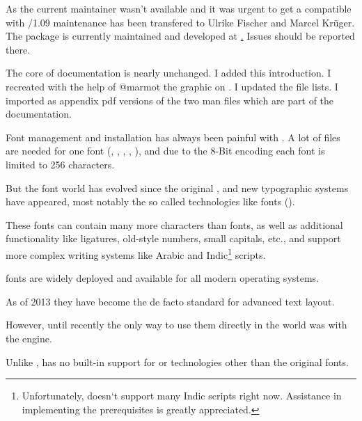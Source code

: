    As the current maintainer wasn't available and it was urgent to get a  compatible with /1.09 maintenance has been transfered to Ulrike Fischer and Marcel Krüger. The package is currently maintained and developed at \hyperlink{https://github.com/u-fischer/luaotfload}. Issues should be reported there.
  \endaltitem

  The core of documentation is nearly unchanged. I added this introduction. I recreated with the help of @marmot the graphic on \pageref{file-graph}. I updated the file lists. I imported as appendix pdf versions of the two man files which are part of the  documentation.
  \endaltitem

\enddescriptions

\endsection

Font management and installation has always been painful with \TEX.  A
lot of files are needed for one font (, ,
, , ), and due to the 8-Bit encoding
each font is limited to 256 characters.

But the font world has evolved since the original \TEX, and new
typographic systems have appeared, most notably the so called
 technologies like \OpenType fonts ().

These fonts can contain many more characters than \TEX fonts, as well
as additional functionality like ligatures, old-style numbers, small
capitals, etc., and support more complex writing systems like Arabic
and Indic\footnote{%
  Unfortunately,  doesn‘t support many Indic
  scripts right now.
  Assistance in implementing the prerequisites is greatly
  appreciated.
}
scripts.

\OpenType fonts are widely deployed and available for all modern
operating systems.

As of 2013 they have become the de facto standard for advanced text
layout.

However, until recently the only way to use them directly in the \TEX
world was with the \XETEX engine.

Unlike \XETEX, \LUATEX has no built-in support for \OpenType or
technologies other than the original \TEX fonts.

